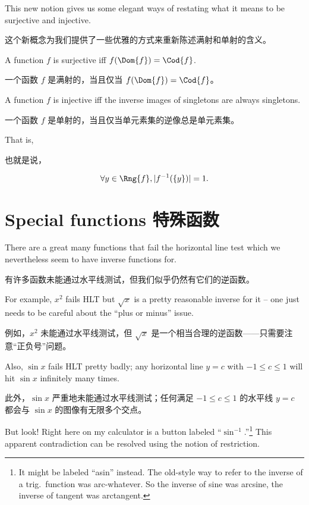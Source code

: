 This new notion gives us some elegant
ways of restating what it means to be surjective and injective.

这个新概念为我们提供了一些优雅的方式来重新陈述满射和单射的含义。

A function $f$ is surjective iff $f(\Dom{f}) = \Cod{f}$.  

一个函数 $f$ 是满射的，当且仅当 $f(\Dom{f}) = \Cod{f}$。

A function $f$ is injective iff the inverse images of singletons
are always singletons.

一个函数 $f$ 是单射的，当且仅当单元素集的逆像总是单元素集。

That is,

也就是说，

\[ \forall y \in \Rng{f}, |f^{-1}(\{y\})| = 1.
\] 

\newpage





\newpage

\section{Special functions 特殊函数}
\label{sec:special_functions}


There are a great many functions that fail the horizontal line test
which we nevertheless seem to have inverse functions for.

有许多函数未能通过水平线测试，但我们似乎仍然有它们的逆函数。

For example,
$x^2$ fails HLT but $\sqrt{x}$ is a pretty reasonable inverse for it --
one just needs to be careful about the ``plus or minus'' issue.

例如，$x^2$ 未能通过水平线测试，但 $\sqrt{x}$ 是一个相当合理的逆函数——只需要注意“正负号”问题。

Also,
$\sin{x}$ fails HLT pretty badly; any horizontal line $y=c$ with 
$-1 \leq c \leq 1$ will hit $\sin{x}$ infinitely many times.

此外，$\sin{x}$ 严重地未能通过水平线测试；任何满足 $-1 \leq c \leq 1$ 的水平线 $y=c$ 都会与 $\sin{x}$ 的图像有无限多个交点。

But look!
Right here on my calculator is a button labeled ``$\sin^{-1}$.''\footnote{It 
might be labeled ``asin'' instead. The old-style way to refer to the inverse
of a trig.\ function was arc-whatever. So the inverse of sine was arcsine,
the inverse of tangent was arctangent.}  This apparent contradiction
can be resolved using the notion of restriction.

